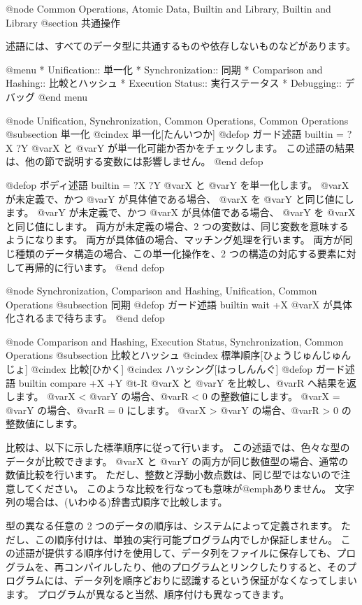 {@node Common Operations, Atomic Data, Builtin and Library, Builtin and Library
@section 共通操作

述語には、すべてのデータ型に共通するものや依存しないものなどがあります。

@menu
* Unification::                 単一化
* Synchronization::             同期
* Comparison and Hashing::      比較とハッシュ
* Execution Status::            実行ステータス
* Debugging::                   デバッグ
@end menu

@node Unification, Synchronization, Common Operations, Common Operations
@subsection 単一化
@cindex 単一化[たんいつか]
@defop {ガード述語} {builtin} = ?X ?Y
 @var{X} と @var{Y} が単一化可能か否かをチェックします。
この述語の結果は、他の節で説明する変数には影響しません。
@end defop

@defop {ボディ述語} {builtin} = ?X ?Y
 @var{X} と @var{Y} を単一化します。
 @var{X} が未定義で、かつ @var{Y} が具体値である場合、
 @var{X} を @var{Y} と同じ値にします。
 @var{Y} が未定義で、かつ @var{X} が具体値である場合、
 @var{Y} を @var{X} と同じ値にします。
両方が未定義の場合、2 つの変数は、同じ変数を意味するようになります。
両方が具体値の場合、マッチング処理を行います。
両方が同じ種類のデータ構造の場合、この単一化操作を、2 つの構造の対応する要素に対して再帰的に行います。
@end defop

@node Synchronization, Comparison and Hashing, Unification, Common Operations
@subsection 同期
@defop {ガード述語} {builtin} wait +X
 @var{X} が具体化されるまで待ちます。
@end defop

@node Comparison and Hashing, Execution Status, Synchronization, Common Operations
@subsection 比較とハッシュ
@cindex 標準順序[ひょうじゅんじゅんじょ]
@cindex 比較[ひかく]
@cindex ハッシング[はっしんんぐ]
@defop {ガード述語} {builtin} compare +X +Y @t{-}R
 @var{X} と @var{Y} を比較し、@var{R} へ結果を返します。
 @var{X} < @var{Y} の場合、@var{R} < 0 の整数値にします。
 @var{X} = @var{Y} の場合、@var{R} = 0 にします。
 @var{X} > @var{Y} の場合、@var{R} > 0 の整数値にします。

比較は、以下に示した標準順序に従って行います。
この述語では、色々な型のデータが比較できます。
 @var{X} と @var{Y} の両方が同じ数値型の場合、通常の数値比較を行います。
ただし、整数と浮動小数点数は、同じ型ではないので注意してください。
このような比較を行なっても意味が@emph{ありません}。
文字列の場合は、(いわゆる)辞書式順序で比較します。

型の異なる任意の 2 つのデータの順序は、システムによって定義されます。
ただし、この順序付けは、単独の実行可能プログラム内でしか保証しません。
この述語が提供する順序付けを使用して、データ列をファイルに保存しても、プログラムを、再コンパイルしたり、他のプログラムとリンクしたりすると、そのプログラムには、データ列を順序どおりに認識するという保証がなくなってしまいます。
プログラムが異なると当然、順序付けも異なってきます。

}

